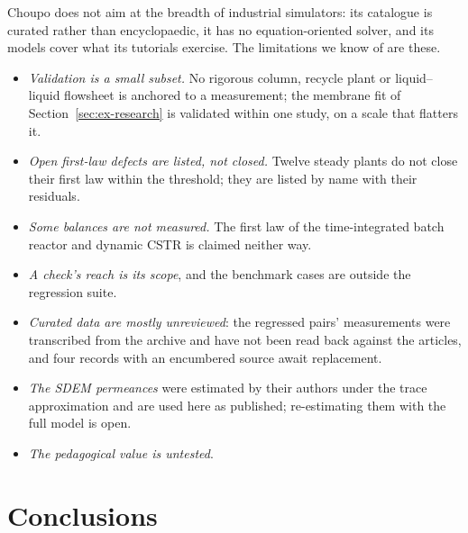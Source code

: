 \documentclass[preprint,12pt]{elsarticle}
\begin{document}
Choupo does not aim at the breadth of industrial simulators: its catalogue
is curated rather than encyclopaedic, it has no equation-oriented solver,
and its models cover what its tutorials exercise.  The limitations we know
of are these.
\begin{itemize}
\item \emph{Validation is a small subset.}  No rigorous column, recycle
  plant or liquid--liquid flowsheet is anchored to a measurement; the
  membrane fit of Section~\ref{sec:ex-research} is validated within one
  study, on a scale that flatters it.
\item \emph{Open first-law defects are listed, not closed.}  Twelve steady
  plants do not close their first law within the threshold; they are listed
  by name with their residuals.
\item \emph{Some balances are not measured.}  The first law of the
  time-integrated batch reactor and dynamic CSTR is claimed neither way.
\item \emph{A check's reach is its scope}, and the benchmark cases are
  outside the regression suite.
\item \emph{Curated data are mostly unreviewed}: the regressed pairs'
  measurements were transcribed from the archive and have not been read
  back against the articles, and four records with an encumbered source
  await replacement.
\item \emph{The SDEM permeances} were estimated by their authors under the
  trace approximation and are used here as published; re-estimating them
  with the full model is open.
\item \emph{The pedagogical value is untested}.
\end{itemize}

\section{Conclusions}
\label{sec:conclusions}
\end{document}
